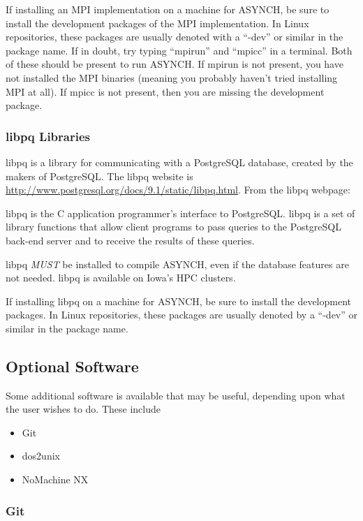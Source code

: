 \documentclass[12pt]{article}
\newenvironment{codeindent}
{\begin{list}{}
        {\setlength{\leftmargin}{.1in}}
        \item[]
}
{\end{list}}
\begin{document}
If installing an MPI implementation on a machine for ASYNCH, be sure to install the development packages of the MPI implementation. In Linux repositories, these packages are usually denoted with a ``-dev'' or similar in the package name. If in doubt, try typing ``mpirun'' and ``mpicc'' in a terminal. Both of these should be present to run ASYNCH. If mpirun is not present, you have not installed the MPI binaries (meaning you probably haven't tried installing MPI at all). If mpicc is not present, then you are missing the development package.

\subsubsection{libpq Libraries} \label{sec: libpq libraries}

libpq is a library for communicating with a PostgreSQL database, created by the makers of PostgreSQL. The libpq website is \url{http://www.postgresql.org/docs/9.1/static/libpq.html}. From the libpq webpage:
\begin{codeindent}
 libpq is the C application programmer's interface to PostgreSQL. libpq is a set of library functions that allow client programs to pass queries to the PostgreSQL back-end server and to receive the results of these queries.
\end{codeindent}
libpq \emph{MUST} be installed to compile ASYNCH, even if the database features are not needed. libpq is available on Iowa's HPC clusters.

If installing libpq on a machine for ASYNCH, be sure to install the development packages. In Linux repositories, these packages are usually denoted by a ``-dev'' or similar in the package name.


\subsection{Optional Software} \label{sec: optional software}

Some additional software is available that may be useful, depending upon what the user wishes to do. These include
\begin{itemize}
 \item Git
 \item dos2unix
 \item NoMachine NX
\end{itemize}

\subsubsection{Git} \label{sec: git}
\end{document}
